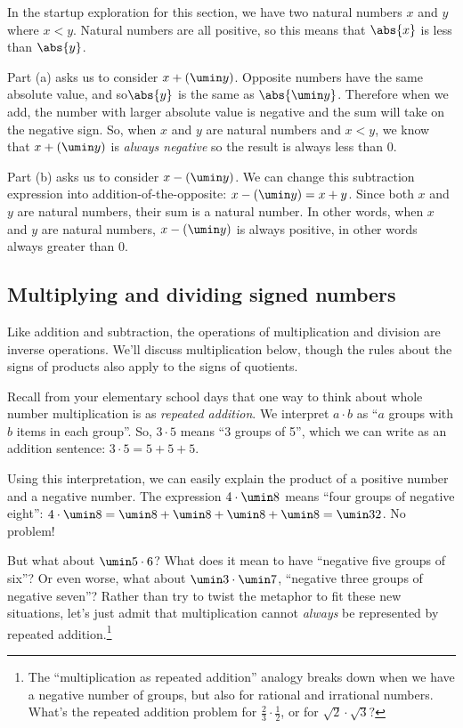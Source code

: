 In the startup exploration for this section, we have two natural numbers $x$ and $y$ where $x < y$. Natural numbers are all positive, so this means that $\abs{x}$ is less than $\abs{y}$.

Part (a) asks us to consider $x+(\umin y)$. Opposite numbers have the same absolute value,  and so$\abs{y}$ is the same as $\abs{\umin y}$. Therefore when we add, the number with larger absolute value is negative and the sum will take on the negative sign. So, when $x$ and $y$ are natural numbers and $x < y$, we know that $x+(\umin y)$ is \textit{always negative} so the result is always less than 0.

Part (b) asks us to consider $x-(\umin y)$. We can change this subtraction expression into addition-of-the-opposite: $x-(\umin y) = x+y$. Since both $x$ and $y$ are natural numbers, their sum is a natural number. In other words, when $x$ and $y$ are natural numbers, $x-(\umin y)$ is always positive, in other words always greater than 0.

\subsection{Multiplying and dividing signed numbers}

Like addition and subtraction, the operations of multiplication and division are inverse operations. We'll discuss multiplication below, though the rules about the signs of products also apply to the signs of quotients.

Recall from your elementary school days that one way to think about whole number multiplication is as \textit{repeated addition}. We interpret $a \cdot b$ as ``$a$ groups with $b$ items in each group''. So, $3 \cdot 5$ means ``3 groups of 5'', which we can write as an addition sentence: $3 \cdot 5 = 5 + 5 + 5$.

Using this interpretation, we can easily explain the product of a positive number and a negative number. The expression $4\cdot\umin8$ means ``four groups of negative eight'': $4 \cdot \umin8 = \umin8 + \umin8 + \umin8 + \umin8 = \umin32$. No problem!

But what about $\umin5 \cdot 6$? What does it mean to have ``negative five groups of six''? Or even worse, what about $\umin3 \cdot \umin7$, ``negative three groups of negative seven''? Rather than try to twist the metaphor to fit these new situations, let's just admit that multiplication cannot \textit{always} be represented by repeated addition.\footnote{The ``multiplication as repeated addition'' analogy breaks down when we have a negative number of groups, but also for rational and irrational numbers. What's the repeated addition problem for $\frac{2}{3} \cdot \frac{1}{2}$, or for $\sqrt{2} \cdot \sqrt{3}?$}

